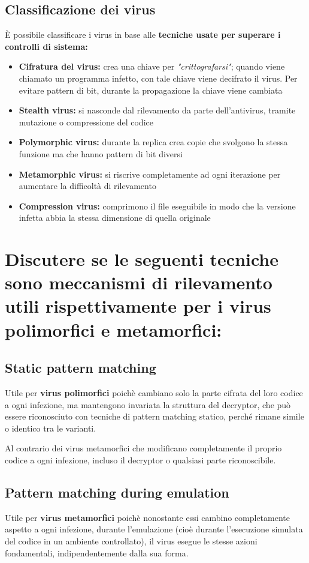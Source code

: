 \documentclass{report}
\begin{document}
\subsection{Classificazione dei virus}
È possibile classificare i virus in base alle \textbf{tecniche usate per superare i controlli 
di sistema:}
\begin{itemize}
    \item \textbf{Cifratura del virus:} crea una chiave per \textit{"crittografarsi"}; quando viene 
    chiamato un programma infetto, con tale chiave viene decifrato il virus. Per evitare pattern 
    di bit, durante la propagazione la chiave viene cambiata
    \item \textbf{Stealth virus:} si nasconde dal rilevamento da parte dell'antivirus, tramite mutazione 
    o compressione del codice 
    \item \textbf{Polymorphic virus:} durante la replica crea copie che svolgono la stessa funzione 
    ma che hanno pattern di bit diversi 
    \item \textbf{Metamorphic virus:} si riscrive completamente ad ogni iterazione per aumentare la 
    difficoltà di rilevamento
    \item \textbf{Compression virus:} comprimono il file eseguibile in modo che la versione infetta 
    abbia la stessa dimensione di quella originale
\end{itemize} 

\section{Discutere se le seguenti tecniche sono meccanismi di rilevamento utili rispettivamente per i virus polimorfici e metamorfici:}

\subsection{Static pattern matching}
\noindent Utile per \textbf{virus polimorfici} poichè cambiano solo la parte cifrata del loro codice a ogni infezione, ma mantengono invariata la struttura del decryptor,
che può essere riconosciuto con tecniche di pattern matching statico, perché rimane simile o identico tra le varianti.

\noindent Al contrario dei virus metamorfici che modificano completamente il proprio codice a ogni infezione, incluso il decryptor o qualsiasi parte riconoscibile.

\subsection{Pattern matching during emulation}
\noindent Utile per \textbf{virus metamorfici} poichè nonostante essi cambino completamente aspetto a ogni infezione, 
durante l'emulazione (cioè durante l'esecuzione simulata del codice in un ambiente controllato), il virus esegue le stesse azioni fondamentali, indipendentemente dalla sua forma.
\end{document}
